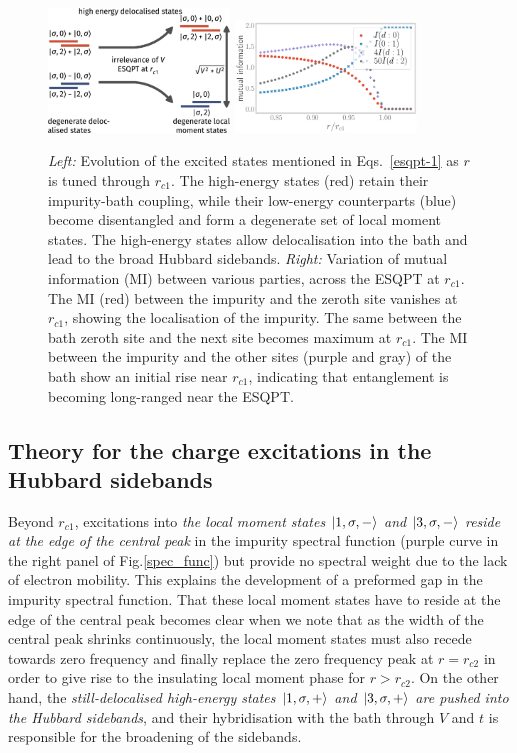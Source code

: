 \documentclass{iopart}
\begin{document}
\begin{figure}[htpb]
	\includegraphics[width=0.43\textwidth]{ESQPT.pdf}
	\hspace*{\fill}
	\includegraphics[width=0.43\textwidth]{Uc1-mutinfo.pdf}
	\caption{{\it Left:} Evolution of the excited states mentioned in Eqs.~\eqref{esqpt-1} as \(r\) is tuned through \(r_{c1}\). The high-energy states (red) retain their impurity-bath coupling, while their low-energy counterparts (blue) become disentangled and form a degenerate set of local moment states. The high-energy states allow delocalisation into the bath and lead to the broad Hubbard sidebands. {\it Right:} Variation of mutual information (MI) between various parties, across the ESQPT at \(r_{c1}\). The MI (red) between the impurity and the zeroth site vanishes at \(r_{c1}\), showing the localisation of the impurity. The same between the bath zeroth site and the next site becomes maximum at \(r_{c1}\). The MI between the impurity and the other sites (purple and gray) of the bath show an initial rise near \(r_{c1}\), indicating that entanglement is becoming long-ranged near the ESQPT.}
	\label{esqpt-schematic}
\end{figure}

\subsection{Theory for the charge excitations in the Hubbard sidebands}
Beyond \(r_{c1}\), excitations into {\it the local moment states \(\ket{1,\sigma,-}\) and \(\ket{3,\sigma,-}\) reside at the edge of the central peak} in the impurity spectral function (purple curve in the right panel of Fig.\eqref{spec_func}) but provide no spectral weight due to the lack of electron mobility. This explains the development of a preformed gap in the impurity spectral function. That these local moment states have to reside at the edge of the central peak becomes clear when we note that as the width of the central peak shrinks continuously, the local moment states must also recede towards zero frequency and finally replace the zero frequency peak at \(r = r_{c2}\) in order to give rise to the insulating local moment phase for \(r > r_{c2}\). On the other hand, the {\it still-delocalised high-energy states \(\ket{1,\sigma,+}\) and \(\ket{3,\sigma,+}\) are pushed into the Hubbard sidebands}, and their hybridisation with the bath through \(V\) and \(t\) is responsible for the broadening of the sidebands. 
\end{document}
